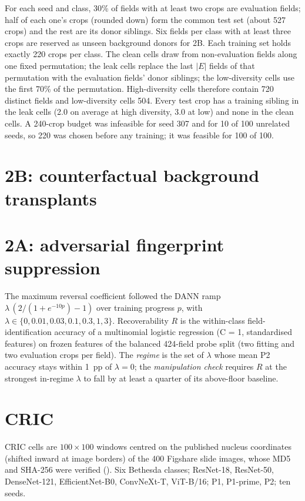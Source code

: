 For each seed and class, 30\% of fields with at least two crops are evaluation fields; half of each one's crops (rounded
down) form the common test set (about 527 crops) and the rest are its donor siblings. Six fields per class with at least
three crops are reserved as unseen background donors for 2B. Each training set holds exactly 220 crops per class. The
clean cells draw from non-evaluation fields along one fixed permutation; the leak cells replace the last $|E|$ fields of
that permutation with the evaluation fields' donor siblings; the low-diversity cells use the first 70\% of the
permutation. High-diversity cells therefore contain 720 distinct fields and low-diversity cells 504. Every test crop
has a training sibling in the leak cells (2.0 on average at high diversity, 3.0 at low) and none in the clean cells. A
240-crop budget was infeasible for seed 307 and for 10 of 100 unrelated seeds, so 220 was chosen before any training;
it was feasible for 100 of 100.

\section{2B: counterfactual background transplants}



\section{2A: adversarial fingerprint suppression}



The maximum reversal coefficient followed the DANN ramp $\lambda\,(2/(1+e^{-10p})-1)$ over training progress $p$, with
$\lambda\in\{0, 0.01, 0.03, 0.1, 0.3, 1, 3\}$. Recoverability $R$ is the within-class field-identification accuracy of a
multinomial logistic regression (C = 1, standardised features) on frozen features of the balanced 424-field probe split
(two fitting and two evaluation crops per field). The \emph{regime} is the set of $\lambda$ whose mean P2 accuracy stays
within 1~pp of $\lambda=0$; the \emph{manipulation check} requires $R$ at the strongest in-regime $\lambda$ to fall by at
least a quarter of its above-floor baseline.

\section{CRIC}

CRIC cells are $100\times100$ windows centred on the published nucleus coordinates (shifted inward at image borders) of
the 400 Figshare slide images, whose MD5 and SHA-256 were verified ().
Six Bethesda classes; ResNet-18, ResNet-50, DenseNet-121, EfficientNet-B0, ConvNeXt-T, ViT-B/16; P1, P1-prime, P2; ten
seeds.

